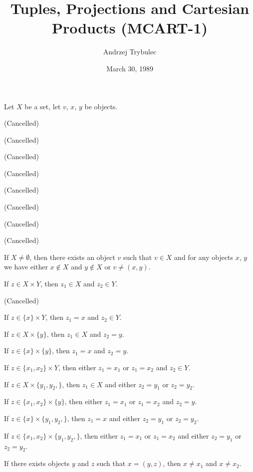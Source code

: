 \documentclass{article}
\title{Tuples, Projections and Cartesian Products (MCART-1)}
\author{Andrzej Trybulec}
\date{March 30, 1989}
\begin{document}
\maketitle

Let $X$ be a set, let $v$, $x$, $y$ be objects.
\begin{thm}
\item\label{mcart1:1} (Cancelled)
\item\label{mcart1:2} (Cancelled)
\item\label{mcart1:3} (Cancelled)
\item\label{mcart1:4} (Cancelled)
\item\label{mcart1:5} (Cancelled)
\item\label{mcart1:6} (Cancelled)
\item\label{mcart1:7} (Cancelled)
\item\label{mcart1:8} (Cancelled)
\item\label{mcart1:9} If $X\neq\emptyset$,
  then there exists an object $v$ such that $v\in X$
  and for any objects $x$, $y$ we have
  either $x\notin X$ and $y\notin X$ or $v\neq(x,y)$. 
\item\label{mcart1:10} If $z\in X\times Y$, then $z_{1}\in X$ and
  $z_{2}\in Y$.
\item\label{mcart1:11} (Cancelled)
\item\label{mcart1:12} If $z\in\{x\}\times Y$, then $z_{1}=x$ and
  $z_{2}\in Y$.
\item\label{mcart1:13} If $z\in X\times\{y\}$, then $z_{1}\in X$ and $z_{2}=y$.
\item\label{mcart1:14} If $z\in\{x\}\times\{y\}$, then $z_{1}=x$ and $z_{2}=y$.
\item\label{mcart1:15} If $z\in\{x_{1},x_{2}\}\times Y$, then either
  $z_{1}=x_{1}$ or $z_{1}=x_{2}$ and
  $z_{2}\in Y$.
\item\label{mcart1:16} If $z\in X\times\{y_{1},y_{2},\}$, then $z_{1}\in X$
  and either $z_{2}=y_{1}$ or $z_{2}=y_{2}$.
\item\label{mcart1:17} If $z\in\{x_{1},x_{2}\}\times \{y\}$, then either
  $z_{1}=x_{1}$ or $z_{1}=x_{2}$ and
  $z_{2}=y$.
\item\label{mcart1:18} If $z\in \{x\}\times\{y_{1},y_{2},\}$, then $z_{1}=x$
  and either $z_{2}=y_{1}$ or $z_{2}=y_{2}$.
\item\label{mcart1:19} If $z\in \{x_{1},x_{2}\}\times\{y_{1},y_{2},\}$,
  then either $z_{1}=x_{1}$ or $z_{1}=x_{2}$ and either $z_{2}=y_{1}$ or $z_{2}=y_{2}$.
\item\label{mcart1:20} If there exists objects $y$ and $z$ such that
  $x=(y,z)$,
  then $x\neq x_{1}$ and $x\neq x_{2}$.
\end{thm}
\end{document}
